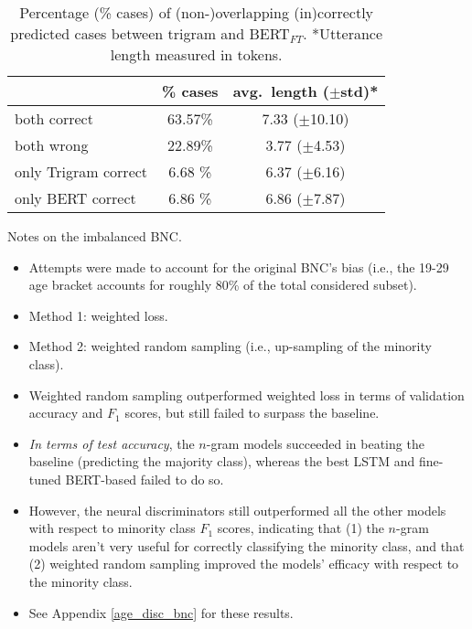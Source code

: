 \begin{table}[H]
    \centering
    \begin{tabular}{@{}l  c  c @{}}
    \toprule
    \textbf{} & \textbf{\% cases} & \textbf{avg.\ length ($\pm$std)*}\\
    \midrule
    both correct & 63.57\% & 7.33 ($\pm$10.10) \\
    both wrong & 22.89\% & 3.77 ($\pm$4.53) \\
    only Trigram correct & 6.68 \% & 6.37 ($\pm$6.16) \\
    only BERT correct & 6.86 \% & 6.86 ($\pm$7.87) \\ \bottomrule
    \end{tabular}
    \caption{Percentage (\% cases) of (non-)overlapping (in)correctly predicted cases between trigram and BERT$_{FT}$. *Utterance length measured in tokens.}
    \label{tab:bnc_tri_bert_cases}
\end{table}

Notes on the imbalanced BNC.
\begin{itemize}
    \item Attempts were made to account for the original BNC's bias (i.e., the 19-29 age bracket accounts for roughly 80\% of the total considered subset).
    \item Method 1: weighted loss.
    \item Method 2: weighted random sampling (i.e., up-sampling of the minority class).
    \item Weighted random sampling outperformed weighted loss in terms of validation accuracy and $F_1$ scores, but still failed to surpass the baseline.
    \item  \textit{In terms of test accuracy}, the $n$-gram models succeeded in beating the baseline (predicting the majority class), whereas the best LSTM and fine-tuned BERT-based failed to do so.
    \item However, the neural discriminators still outperformed all the other models with respect to minority class $F_1$ scores, indicating that (1) the $n$-gram models aren't very useful for correctly classifying the minority class, and that (2) weighted random sampling improved the models' efficacy with respect to the minority class.
    \item See Appendix \ref{age_disc_bnc} for these results.
\end{itemize}


